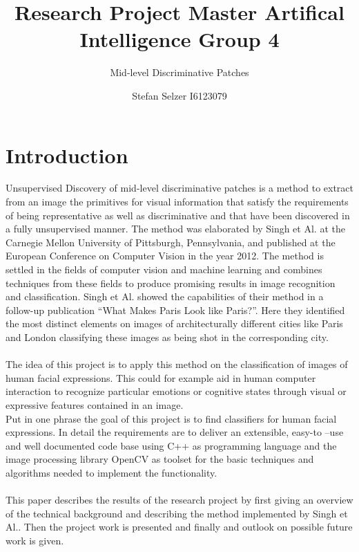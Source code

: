 \documentclass[%
   final,      %
   paper=a4,%
   paper=portrait, %
   pagesize=auto, %
   fontsize=10pt,%
   version=last, %
 ]{scrartcl} %
\title{Research Project Master Artifical Intelligence Group 4}
\subtitle{Mid-level Discriminative Patches}
\author{Stefan Selzer I6123079}
\begin{document}
\maketitle

\newpage
\tableofcontents
\newpage
\section{Introduction}\label{sec:Introduction}
Unsupervised Discovery of mid-level discriminative patches is a method to extract from an image the primitives for visual information that satisfy the requirements of being representative as well as discriminative and that have been discovered in a fully unsupervised manner. The method was elaborated by Singh et Al. at the Carnegie Mellon University of Pittsburgh, Pennsylvania, and published at the European Conference on Computer Vision in the year 2012.\cite{Singh2012DiscPat} The method is settled in the fields of computer vision and machine learning and combines techniques from these fields to produce promising results in image recognition and classification. Singh et Al. showed the capabilities of their method in a follow-up publication “What Makes Paris Look like Paris?”.\cite{doersch2012what} Here they identified the most distinct elements on images of architecturally different cities like Paris and London classifying these images as being shot in the corresponding city.
\\
\\
The idea of this project is to apply this method on the classification of images of human facial expressions. This could for example aid in human computer interaction to recognize particular emotions or cognitive states through visual or expressive features contained in an image.
\\
Put in one phrase the goal of this project is to find classifiers for human facial expressions.
In detail the requirements are to deliver an extensible, easy-to –use and well documented code base using C++ as programming language and the image processing library OpenCV as toolset for the basic techniques and algorithms needed to implement the functionality.
\\
\\
This paper describes the results of the research project by first giving an overview of the technical background and describing the method implemented by Singh et Al.. Then the project work is presented and finally and outlook on possible future work is given.
\end{document}
